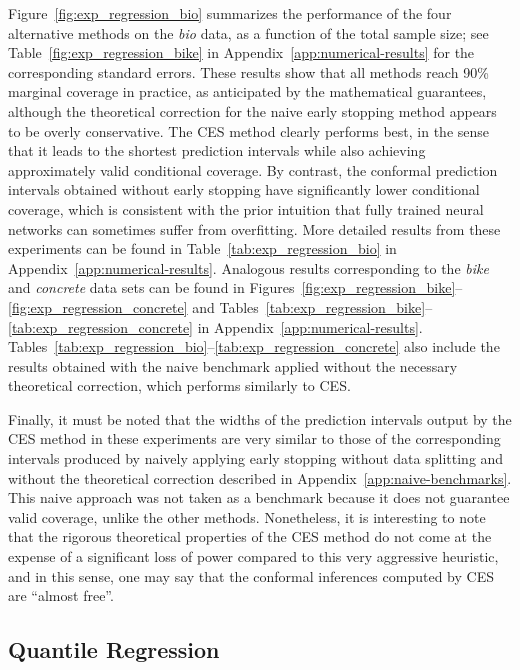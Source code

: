 Figure~\ref{fig:exp_regression_bio} summarizes the performance of the four alternative methods on the {\em bio} data, as a function of the total sample size;  see Table~\ref{fig:exp_regression_bike} in Appendix~\ref{app:numerical-results} for the corresponding standard errors. These results show that all methods reach 90\% marginal coverage in practice, as anticipated by the mathematical guarantees, although the theoretical correction for the naive early stopping method appears to be overly conservative. The CES method clearly performs best, in the sense that it leads to the shortest prediction intervals while also achieving approximately valid conditional coverage. By contrast, the conformal prediction intervals obtained without early stopping have significantly lower conditional coverage, which is consistent with the prior intuition that fully trained neural networks can sometimes suffer from overfitting.
More detailed results from these experiments can be found in Table~\ref{tab:exp_regression_bio} in Appendix~\ref{app:numerical-results}.
Analogous results corresponding to the {\em bike} and {\em concrete} data sets can be found in Figures~\ref{fig:exp_regression_bike}--\ref{fig:exp_regression_concrete} and Tables~\ref{tab:exp_regression_bike}--\ref{tab:exp_regression_concrete} in Appendix~\ref{app:numerical-results}.
Tables~\ref{tab:exp_regression_bio}--\ref{tab:exp_regression_concrete} also include the results obtained with the naive benchmark applied without the necessary theoretical correction, which performs similarly to CES.

Finally, it must be noted that the widths of the prediction intervals output by the CES method in these experiments are very similar to those of the corresponding intervals produced by naively applying early stopping without data splitting and without the theoretical correction described in Appendix~\ref{app:naive-benchmarks}.
This naive approach was not taken as a benchmark because it does not guarantee valid coverage, unlike the other methods. Nonetheless, it is interesting to note that the rigorous theoretical properties of the CES method do not come at the expense of a significant loss of power compared to this very aggressive heuristic, and in this sense, one may say that the conformal inferences computed by CES are ``almost free''.


\subsection{Quantile Regression}


